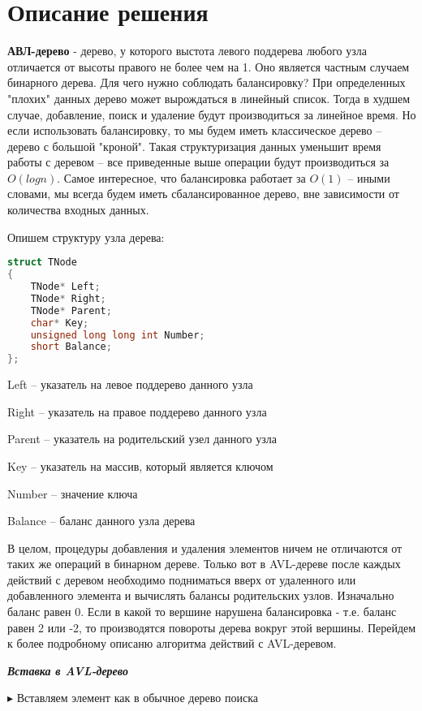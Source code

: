 \section{Описание решения}
\textbf{АВЛ-дерево} - дерево, у которого выстота левого поддерева любого узла отличается от высоты правого не более чем на 1. Оно является частным случаем бинарного дерева. Для чего нужно соблюдать балансировку? При определенных "плохих" данных дерево может вырождаться в линейный список. Тогда в худшем случае, добавление, поиск и удаление будут производиться за линейное время. Но если использовать балансировку, то мы будем иметь классическое дерево -- дерево с большой "кроной". Такая структуризация данных уменьшит время работы с деревом -- все приведенные выше операции будут производиться за $O(logn)$.
Самое интересное, что балансировка работает за $O(1)$ -- иными словами, мы всегда будем иметь сбалансированное дерево, вне зависимости от количества входных данных.

Опишем структуру узла дерева:
\begin{lstlisting}[language=C]
struct TNode
{
    TNode* Left;
    TNode* Right;
    TNode* Parent;
    char* Key;
    unsigned long long int Number;
    short Balance;
};
\end{lstlisting}
Left -- указатель на левое поддерево данного узла

Right -- указатель на правое поддерево данного узла

Parent -- указатель на родительский узел данного узла

Key -- указатель на массив, который является ключом

Number -- значение ключа

Balance -- баланс данного узла дерева

В целом, процедуры добавления и удаления элементов ничем не отличаются от таких же операций в бинарном дереве. Только вот в AVL-дереве после каждых действий с деревом необходимо подниматься вверх от удаленного или добавленного элемента и вычислять балансы родительских узлов. Изначально баланс равен 0. Если в какой то вершине нарушена балансировка - т.е. баланс равен 2 или -2, то производятся повороты дерева вокруг этой вершины. Перейдем к более подробному описаню алгоритма действий с AVL-деревом.

\pagebreak

\textbf{\textit{Вставка в AVL-дерево}}

$\blacktriangleright$ Вставляем элемент как в обычное дерево поиска

